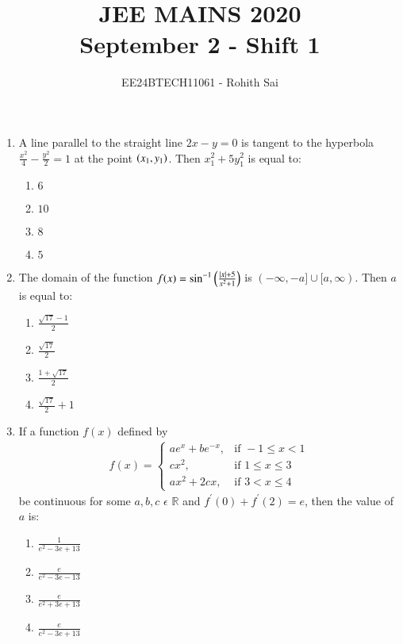 \documentclass[journal]{IEEEtran}
\begin{document}

\vspace{3cm}

\title{JEE MAINS 2020\\September 2 - Shift 1}
\author{EE24BTECH11061 - Rohith Sai}
\maketitle

\renewcommand{\thefigure}{\theenumi}
\renewcommand{\thetable}{\theenumi}
\begin{enumerate}
\item A line parallel to the straight line $2x-y = 0$ is tangent to the hyperbola $\frac{x^2}{4}-\frac{y^2}{2} = 1$ at the point $\left(x_1, y_1\right)$. Then $x_1^2 + 5y_1^2$ is equal to:
\begin{multicols}{2}
    \begin{enumerate}
        \item $6$
        \item $10$
        \item $8$
        \item $5$
    \end{enumerate}
\end{multicols}

\item The domain of the function $f(x) = \sin^{-1}\left(\frac{\left\vert x\right\vert+5}{x^2+1}\right)$ is $(-\infty,-a] \cup [a,\infty) $. Then $a$ is equal to:
\begin{multicols}{2}
    \begin{enumerate}
        \item $\frac{\sqrt{17}-1}{2}$
        \item $\frac{\sqrt{17}}{2}$
        \item $\frac{1+\sqrt{17}}{2}$
        \item $\frac{\sqrt{17}}{2} + 1$
        \end{enumerate}
\end{multicols}

\item If a function $f(x)$ defined by
\begin{align*}
    f(x) = \begin{cases}
ae^x + be^{-x}, & \text{if } -1\leq x < 1\\
cx^2, & \text{if } 1\leq x \leq 3\\
ax^2 + 2cx, & \text{if } 3 < x \leq 4
\end{cases}
\end{align*}
be continuous for some $a,b,c$ $\epsilon$ $\mathbb{R}$ and $f^{\prime}(0) + f^{\prime}(2) = e$, then the value of $a$ is:
\begin{multicols}{2}
    \begin{enumerate}
        \item $\frac{1}{e^2-3e+13}$
        \item $\frac{e}{e^2-3e-13}$
        \item $\frac{e}{e^2+3e+13}$
        \item $\frac{e}{e^2-3e+13}$
    \end{enumerate}
\end{multicols}


\end{enumerate}
\end{document}
